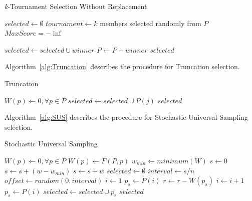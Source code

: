 \documentclass[sigconf]{acmart}
\begin{document}
\begin{algorithm}
	\caption{\textit{k}-Tournament Selection Without Replacement}
	\label{alg:TournamentNoReplacement}
	\begin{algorithmic}[1]
		 \label{proc:TournamentNoReplacement}
		\State $selected \leftarrow \emptyset$
		\State $tournament \leftarrow k$ members selected randomly from $P$
		\State $MaxScore = -\inf$
		
		\EndIf			
		\EndFor
		\State $selected \leftarrow selected \cup winner$
		\State $P \leftarrow P - winner$
		\EndFor
		\State \Return $selected$
		\EndFunction
	\end{algorithmic}
\end{algorithm}

Algorithm~\ref{alg:Truncation} describes the procedure for Truncation selection.

\begin{algorithm}
	\caption{Truncation}
	\label{alg:Truncation}
	\begin{algorithmic}[1]
		 \label{proc:Truncation}
		\State $W(p) \leftarrow 0,\forall p \in P$
		\EndFor
		\State $selected \leftarrow selected \cup P(j)$
		\EndFor
		\State \Return $selected$
		\EndFunction
	\end{algorithmic}
\end{algorithm}

Algorithm~\ref{alg:SUS} describes the procedure for Stochastic-Universal-Sampling selection.

\begin{algorithm}
	\caption{Stochastic Universal Sampling}
	\label{alg:SUS}
	\begin{algorithmic}[1]
		 \label{proc:SUS}
		\State $W(p) \leftarrow 0,\forall p \in P$
		\State $W(p) \leftarrow F(P,p)$
		\EndFor
		\State $w_{min} \leftarrow minimum(W)$	
		\State $s \leftarrow 0$
		\State $s \leftarrow s + (w - w_{min} )$			
		\Else
		\State $s \leftarrow s + w$		
		\EndIf	
		\EndFor
		\State $selected \leftarrow \emptyset$
		\State $interval \leftarrow s / n$
		\State $offset \leftarrow random(0,interval)$
		\State $i \leftarrow 1$
		\State $p_s \leftarrow P(i)$
		\State $r \leftarrow r - W(p_s)$
		\State $i \leftarrow i + 1$
		\State $p_s \leftarrow P(i)$
		\EndWhile	
		\State $selected \leftarrow selected \cup p_s$	
		\EndFor
		\State \Return $selected$
		\EndFunction
	\end{algorithmic}
\end{algorithm}
\end{document}
